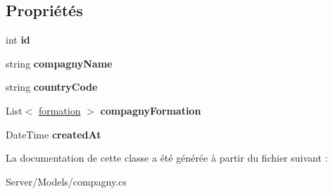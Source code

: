\subsection*{Propriétés}
\begin{DoxyCompactItemize}
\item 
\mbox{\label{class_server_1_1_models_1_1compagny_a97dec5e41734ddbd2ad1eba4aa5f6e31}} 
int {\bfseries id}
\item 
\mbox{\label{class_server_1_1_models_1_1compagny_a2261c5cc131c6eb79aca08de15d72aed}} 
string {\bfseries compagny\+Name}
\item 
\mbox{\label{class_server_1_1_models_1_1compagny_aa513637008eabfb2eae5b6eec7edeeab}} 
string {\bfseries country\+Code}
\item 
\mbox{\label{class_server_1_1_models_1_1compagny_ae994907951deeb8ac574615283219d2e}} 
List$<$ \hyperlink{class_server_1_1_models_1_1formation}{formation} $>$ {\bfseries compagny\+Formation}
\item 
\mbox{\label{class_server_1_1_models_1_1compagny_acb829f90b44ab55980a579cc226a8adb}} 
Date\+Time {\bfseries created\+At}
\end{DoxyCompactItemize}


La documentation de cette classe a été générée à partir du fichier suivant \+:\begin{DoxyCompactItemize}
\item 
Server/\+Models/compagny.\+cs\end{DoxyCompactItemize}
